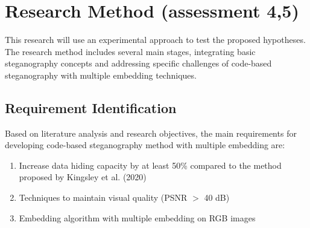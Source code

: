 \documentclass{ittelkom}
\begin{document}


\section{Research Method \color{red}(assessment 4,5)}

This research will use an experimental approach to test the proposed
hypotheses. The research method includes several main stages, integrating basic
steganography concepts and addressing specific challenges of code-based
steganography with multiple embedding techniques.
\subsection{Requirement Identification}

Based on literature analysis and research objectives, the main requirements for
developing code-based steganography method with multiple embedding are:

\begin{enumerate}
    \item Increase data hiding capacity by at least 50\% compared to the method proposed
          by Kingsley et al. (2020)
    \item Techniques to maintain visual quality (PSNR $>$ 40 dB)
    \item Embedding algorithm with multiple embedding on RGB images
\end{enumerate}
\end{document}
